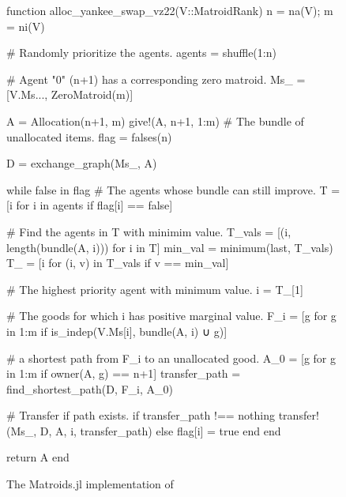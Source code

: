\begin{figure}
\begin{jllisting}
function alloc_yankee_swap_vz22(V::MatroidRank)
  n = na(V); m = ni(V)

  # Randomly prioritize the agents.
  agents = shuffle(1:n)

  # Agent "0" (n+1) has a corresponding zero matroid.
  Ms_ = [V.Ms..., ZeroMatroid(m)]

  A = Allocation(n+1, m)
  give!(A, n+1, 1:m) # The bundle of unallocated items.
  flag = falses(n)

  D = exchange_graph(Ms_, A)

  while false in flag
    # The agents whose bundle can still improve.
    T = [i for i in agents if flag[i] == false]
    
    # Find the agents in T with minimim value.
    T_vals = [(i, length(bundle(A, i))) for i in T]
    min_val = minimum(last, T_vals)
    T_ = [i for (i, v) in T_vals if v == min_val]

    # The highest priority agent with minimum value.
    i = T_[1] 

    # The goods for which i has positive marginal value.
    F_i = [g for g in 1:m if is_indep(V.Ms[i], bundle(A, i) ∪ g)]

    #  a shortest path from F_i to an unallocated good.
    A_0 = [g for g in 1:m if owner(A, g) == n+1]
    transfer_path = find_shortest_path(D, F_i, A_0)

    # Transfer if path exists.
    if transfer_path !== nothing
      transfer!(Ms_, D, A, i, transfer_path)
    else
      flag[i] = true
    end
  end
  
  return A
end
\end{jllisting}
\caption{The Matroids.jl implementation of }
\label{code:Yankee-Swap}
\end{figure}
